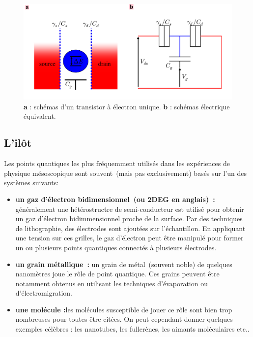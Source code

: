 
\begin{figure}
\includegraphics[scale=0.5]{Theorie/Transport/figure1/figure1.pdf} 
\caption{\textbf{a} : schémas d'un transistor à électron unique. \textbf{b} : schémas électrique équivalent.}
\label{description_systeme}
\end{figure}



\subsection{L'il\^ot}
Les points quantiques les plus fréquemment utilisés dans les expériences de physique mésoscopique sont souvent~(mais pas exclusivement) basés sur l'un des systèmes suivants:
\begin{itemize}
\item \textbf{un gaz d'électron bidimensionnel~(ou 2DEG en anglais)~\cite{Gordon1}:} généralement une hétérostructre de semi-conducteur est utilisé pour obtenir un gaz d'électron bidimmensionnel proche de la surface. Par des techniques de lithographie, des électrodes sont ajoutées sur l'échantillon. En appliquant une tension sur ces grilles, le gaz d'électron peut \^etre manipulé pour former un ou plusieurs points quantiques connectés à plusieurs électrodes.
\item \textbf{un grain métallique~\cite{Deshmukh2002}:} un grain de métal~(souvent noble) de quelques nanomètres joue le rôle de point quantique. Ces grains peuvent \^etre notamment obtenus en utilisant les techniques d'évaporation ou d'électromigration.
\item \textbf{une molécule \cite{Reed1,Park1}:}les molécules susceptible de jouer ce r\^ole sont bien trop nombreuses pour toutes \^etre citées. On peut cependant donner quelques exemples célèbres : les nanotubes, les fullerènes, les aimants moléculaires etc.. \newline
\end{itemize}


